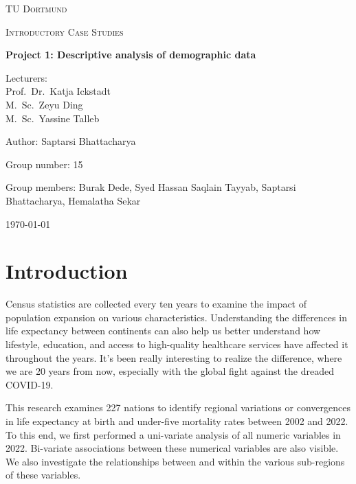 \documentclass[12 pt]{scrartcl}
\begin{document}
\begin{titlepage}
	\centering
	{\scshape\LARGE TU Dortmund \par}
	\vspace{1cm}
	{\scshape\Large Introductory Case Studies \par}
	\vspace{2cm}
	{\huge\bfseries Project 1: Descriptive analysis of demographic data\par}
	\vspace{2cm}
	{\Large Lecturers:\\
		Prof.\ Dr.\ Katja Ickstadt\\
		M.\ Sc.\ Zeyu Ding\\
		M.\ Sc.\ Yassine Talleb \par}
	\vspace{1cm}
	{\Large Author: Saptarsi Bhattacharya \par}
	\vspace{0.5 cm}
	{\Large Group number: 15\par}
	\vspace{0.5 cm}
	{\Large Group members: Burak Dede, Syed Hassan Saqlain Tayyab, Saptarsi Bhattacharya, Hemalatha Sekar}
	\vfill
	{\large \today\par}
\end{titlepage}



\tableofcontents
\thispagestyle{empty}

\cleardoublepage

\setcounter{page}{1}

\section{Introduction}
 Census statistics are collected every ten years to examine the impact of population expansion on various characteristics. Understanding the differences in life expectancy between continents can also help us better understand how lifestyle, education, and access to high-quality healthcare services have affected it throughout the years. It's been really interesting to realize the difference, where we are 20 years from now, especially with the global fight against the dreaded COVID-19.
 
This research examines 227 nations to identify regional variations or convergences in life expectancy at birth and under-five mortality rates between 2002 and 2022. To this end, we first performed a uni-variate analysis of all numeric variables in 2022. Bi-variate associations between these numerical variables are also visible. We also investigate the relationships between and within the various sub-regions of these variables.
\end{document}
